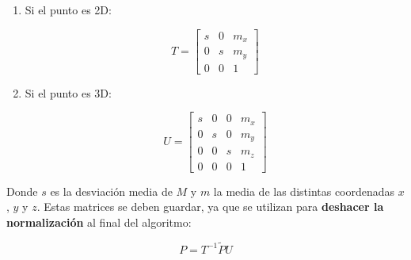 \documentclass[11pt,a4paper]{article}
\theoremstyle{plain}
\theoremstyle{definition}
\begin{document}
\begin{enumerate}[---]
\item Si el punto es 2D:

\begin{displaymath}
T = \left[ \begin{array}{ccc}
                s & 0 & m_x \\
                0 & s & m_y \\
                0 & 0 & 1
              \end{array} \right]
\end{displaymath}
              
\item Si el punto es 3D:

\begin{displaymath}
U = \left[ \begin{array}{cccc}
                s & 0 & 0 & m_x \\
                0 & s & 0 & m_y \\
                0 & 0 & s & m_z \\
                0 & 0 & 0 & 1
              \end{array} \right]
\end{displaymath}
\end{enumerate}

Donde $s$ es la desviación media de $M$ y $m$ la media de las distintas coordenadas $x$, $y$ y $z$. Estas matrices se deben guardar, ya que se utilizan para \textbf{deshacer la normalización} al final del algoritmo:

\begin{displaymath}
P = T^{-1}\tilde{P}U
\end{displaymath}
\end{document}
